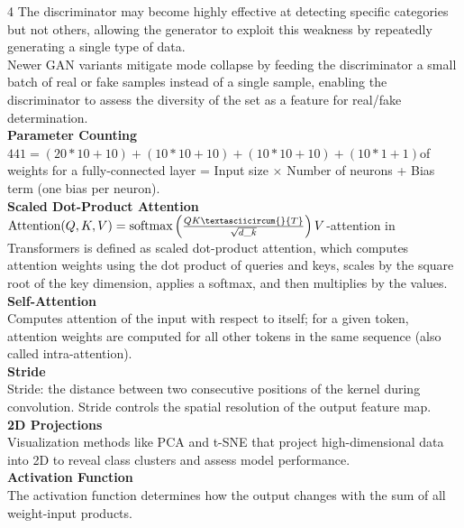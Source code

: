 \documentclass[8pt]{extarticle}
\begin{document}
\begin{multicols}{4}
The discriminator may become highly effective at detecting specific categories but not others, allowing the generator to exploit this weakness by repeatedly generating a single type of data.\\
Newer GAN variants mitigate mode collapse by feeding the discriminator a small batch of real or fake samples instead of a single sample, enabling the discriminator to assess the diversity of the set as a feature for real/fake determination.\\
\vspace{2pt}\textbf{Parameter Counting}\\
$441 = (20*10 + 10) + (10*10 + 10) + (10*10 + 10) + (10*1 + 1)$\Number of weights for a fully-connected layer = Input size $\times$ Number of neurons + Bias term (one bias per neuron).\\
\vspace{2pt}\textbf{Scaled Dot-Product Attention}\\
$\text{Attention}(Q, K, V) = \text{softmax}\left(\frac{Q K\textasciicircum{}{T}}{\sqrt{d\_k}}\right) V$\Self-attention in Transformers is defined as scaled dot-product attention, which computes attention weights using the dot product of queries and keys, scales by the square root of the key dimension, applies a softmax, and then multiplies by the values.\\
\vspace{2pt}\textbf{Self-Attention}\\
Computes attention of the input with respect to itself; for a given token, attention weights are computed for all other tokens in the same sequence (also called intra-attention).\\
\vspace{2pt}\textbf{Stride}\\
Stride: the distance between two consecutive positions of the kernel during convolution. Stride controls the spatial resolution of the output feature map.\\
\vspace{2pt}\textbf{2D Projections}\\
Visualization methods like PCA and t-SNE that project high-dimensional data into 2D to reveal class clusters and assess model performance.\\
\vspace{2pt}\textbf{Activation Function}\\
The activation function determines how the output changes with the sum of all weight-input products.\\

\end{multicols}
\end{document}
